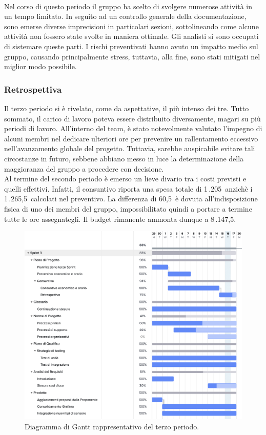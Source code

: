 \\Nel corso di questo periodo il gruppo ha scelto di svolgere numerose attivit\`{a} in un tempo limitato.
In seguito ad un controllo generale della documentazione, sono emerse diverse imprecisioni in
particolari sezioni, sottolineando come alcune attivit\`{a} non fossero state svolte in maniera
ottimale. Gli analisti si sono occupati di sistemare queste parti. I rischi preventivati hanno avuto un impatto medio sul gruppo, causando principalmente stress, tuttavia, alla fine, sono stati mitigati nel miglior modo possibile.
\subsubsection{Retrospettiva}
Il terzo periodo si è rivelato, come da aspettative, il pi\`{u} intenso dei tre. Tutto sommato, il
carico di lavoro poteva essere distribuito diversamente, magari su pi\`{u} periodi di lavoro.
All'interno del team, è stato notevolmente valutato l'impegno di alcuni membri nel dedicare
ulteriori ore per prevenire un rallentamento eccessivo nell'avanzamento globale del progetto.
Tuttavia, sarebbe auspicabile evitare tali circostanze in futuro, sebbene abbiano messo in luce la
determinazione della maggioranza del gruppo a procedere con decisione.\\
Al termine del secondo periodo è emerso un lieve divario tra i costi previsti e quelli effettivi.
Infatti, il consuntivo riporta una spesa totale di 1\,.205\;\texteuro\ anzichè i 1\,.265,5\;\texteuro\ calcolati
nel preventivo. La differenza di 60,5\;\texteuro\ è dovuta all'indisposizione fisica di uno dei membri del gruppo, impossibilitato quindi a portare a termine tutte le ore assegnategli. Il budget rimanente ammonta dunque a 8\,.147,5\;\texteuro.
\begin{figure}[h!]
    \centering
    \includegraphics[width=13cm]{./asset/gantt3.png}
    \caption{Diagramma di Gantt rappresentativo del terzo periodo.}
\end{figure}
\clearpage
